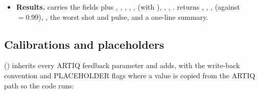 \begin{itemize}[nosep]
    () and draws readings with $\sigma_p \times$
    .
  \item \textbf{Results.}  carries the
     fields plus ,
    , , ,
    ,  (with
    ), , ,
    .  returns ,
    , ,
     (against  $= 0.99$),
    , the worst shot and pulse,
     and a one-line summary.
\end{itemize}

\subsection{Calibrations and placeholders}
\label{sec:feedback:calib}

 () inherits
every ARTIQ feedback parameter and adds, with the write-back convention
 and PLACEHOLDER flags where a value is copied from
the ARTIQ path so the code runs:

